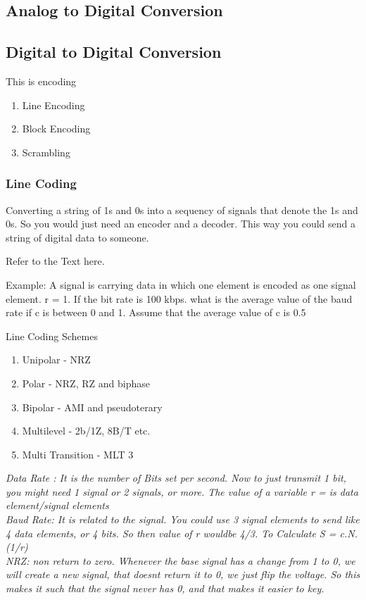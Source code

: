 \documentclass[11pt]{article}
\begin{document}
\subsection{Analog to Digital Conversion}

\subsection{Digital to Digital Conversion}

This is encoding

\begin{enumerate}
	\item Line Encoding
 \item Block Encoding
 \item Scrambling
\end{enumerate}

\subsubsection{Line Coding}

Converting a string of 1s and 0s into a sequency of signals that denote the 1s and 0s. So you would just need an encoder and a decoder. This way you could send a string of digital data to someone.

Refer to the Text here. 

Example: A signal is carrying data in which one element is encoded as one signal element. r = 1. If the bit rate is 100 kbps. what is the average value of the baud rate if c is between 0 and 1. Assume that the average value of c is 0.5

Line Coding Schemes
\begin{enumerate}
	\item Unipolar - NRZ
	\item Polar - NRZ, RZ and biphase
	\item Bipolar - AMI and pseudoterary
	\item Multilevel - 2b/1Z, 8B/T etc. 
	\item Multi Transition - MLT 3
\end{enumerate}



\textit{Data Rate : It is the number of Bits set per second. Now to just transmit 1 bit, you might need 1 signal or 2 signals, or more. The value of a variable r =  is data element/signal elements}\\

\textit{Baud Rate: It is related to the signal. You could use 3 signal elements to send like 4 data elements, or 4 bits. So then value of r wouldbe 4/3. To Calculate S = c.N.(1/r)}\\

\textit{NRZ: non return to zero. Whenever the base signal has a change from 1 to 0, we will create a new signal, that doesnt return it to 0, we just flip the voltage. So this makes it such that the signal never has 0, and that makes it easier to key.
}
\end{document}

